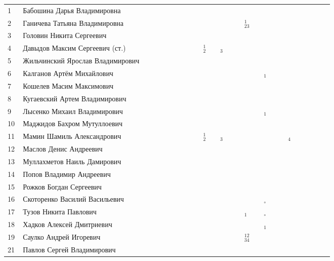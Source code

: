 \documentclass[a4paper,landscape,11pt]{article}
\newcommand*\OK{&\small \ding{51}$\!\!_\circ$} %
\newcommand*\ok{&{\small \ding{51}}} %
\newcommand*\no{&{\small }} %
\newcommand*\da{&{\small\ding{48}$\!\!_1$}} %
\newcommand*\dab{&{\small\ding{48}$\!\!^1_2$}} %
\newcommand*\dabc{&{\small\ding{48}$\!\!^1_{23}$}} %
\newcommand*\dabcd{&{\small\ding{48}$\!\!^{12}_{34}$}} %
\newcommand*\dc{&{\small\ding{48}$\!\!_3$}} %
\newcommand*\dd{&{\small\ding{48}$\!\!_4$}} %
\begin{document}
\begin{tabular}{p{7pt}|l|p{6pt}p{6pt}p{6pt}p{6pt}p{6pt}p{6pt}p{6pt}p{6pt}p{6pt}p{6pt}p{6pt}p{6pt}p{6pt}p{6pt}p{6pt}p{6pt}p{6pt}p{6pt}p{6pt}p{6pt}p{6pt}p{6pt}p{6pt}p{6pt}}
\midrule
 1\,&Бабошина Дарья Владимировна       \\ 
 2\,&Ганичева Татьяна Владимировна   \,\ok\no\ok\ok\ok\no\ok\ok\ok \ok\ok\ok\ok\dabc \ok\no\ok\no\ok\no\no\no\no\\
 3\,&Головин Никита Сергеевич          \ok\no\no\ok\no\no\no\ok\ok \ok   \\
 4\,&Давыдов Максим Сергеевич (ст.)    \ok\ok\ok\ok\ok\ok\ok\ok\dab\ok\dc\ok\ok\ok   \ok\ok\ok\ok\ok\ok\no\ok\ok\\
 5\,&Жильчинский Ярослав Владимирович  \ok\ok\ok\ok\ok\ok\ok\ok\ok \ok\ok\ok\ok\no   \no\ok\ok\ok\ok\ok\ok\ok\ok\\
 6\,&Калганов Артём Михайлович         \ok\no\ok\ok\ok\no\ok\ok\ok \ok\ok\ok\ok\no   \ok\da\ok\ok\ok\ok\ok\ok\no\\
 7\,&Кошелев Масим Максимович          \no\no\no\no\no\no\no\no\no \ok   \\
 8\,&Кугаевский Артем Владимирович     \ok\no\no\ok\ok\no\no\ok\ok \ok\no\ok\no\no   \no\ok\no\no\no\ok\ok\no\no\\
 9\,&Лысенко Михаил Владимирович       \ok\ok\ok\ok\ok\ok\ok\ok\ok \ok\ok\ok\ok\ok   \ok\da\ok\ok\ok\ok\ok\ok\ok\\
10\,&Маджидов Бахром Мутуллоевич       \\
11\,&Мамин Шамиль Александрович        \ok\no\no\ok\ok\no\ok\ok\dab\ok\dc\ok\ok\no   \ok\ok\ok\ok\dd\ok\ok\ok\ok\\
\midrule
12\,&Маслов Денис Андреевич            \ok\ok\ok\ok\ok\no\no\ok\ok \ok\ok\ok\ok\no   \ok\no\no\no\no\\
13\,&Муллахметов Наиль Дамирович       \ok\ok\no\ok\no\no\ok\no\ok \ok\no\no\ok\no   \no\ok\no\no\no\\
14\,&Попов Владимир Андреевич          \ok\ok\no\ok\ok\ok\ok\ok\ok \ok \\
15\,&Рожков Богдан Сергеевич           \\
16\,&Скоторенко Василий Васильевич     \ok\ok\ok\ok\ok\ok\ok\ok\ok \ok\ok\ok\ok\no   \ok\OK\ok\no\ok\no\\
17\,&Тузов Никита Павлович             \ok\ok\ok\ok\ok\ok\ok\ok\ok \ok\ok\ok\ok\da   \ok\OK\ok\ok\ok\ok\ok\no\ok\\
18\,&Хадков Алексей Дмитриевич         \ok\no\ok\ok\ok\ok\ok\ok\ok \ok\ok\ok\ok\ok   \ok\da\ok\ok\ok\ok\ok\ok\ok\\
19\,&Саулко Андрей Игоревич            \ok\no\no\ok\ok\no\no\ok\ok \ok\ok\ok\ok\dabcd\ok\no\ok\ok\ok\ok\ok\ok\ok\\
21\,&Павлов Сергей Владимирович        \ok\ok\no\ok\no\no\no\ok\no \no\ok\no\no\no\\   
\bottomrule
\end{tabular} 
\end{document}
